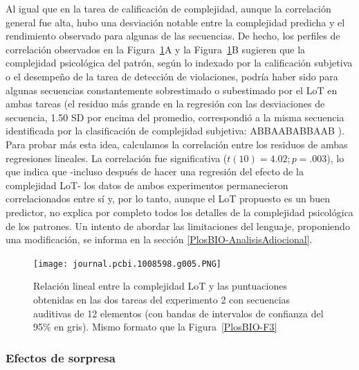 Al igual que en la tarea de calificación de complejidad, aunque la correlación general fue alta, hubo una desviación notable entre la complejidad predicha y el rendimiento observado para algunas de las secuencias. De hecho, los perfiles de correlación observados en la Figura~\ref{PlosBIO-F5}A y la Figura~\ref{PlosBIO-F5}B sugieren que la complejidad psicológica del patrón, según lo indexado por la calificación subjetiva o el desempeño de la tarea de detección de violaciones, podría haber sido para algunas secuencias constantemente sobrestimado o subestimado por el LoT en ambas tareas (el residuo más grande en la regresión con las desviaciones de secuencia, 1.50 SD por encima del promedio, correspondió a la misma secuencia identificada por la clasificación de complejidad subjetiva: ABBAABABBAAB ). Para probar más esta idea, calculamos la correlación entre los residuos de ambas regresiones lineales. La correlación fue significativa ($t (10) = 4.02; p  = .003$), lo que indica que -incluso después de hacer una regresión del efecto de la complejidad LoT- los datos de ambos experimentos permanecieron correlacionados entre sí y, por lo tanto, aunque el LoT propuesto es un buen predictor, no explica por completo todos los detalles de la complejidad psicológica de los patrones. Un intento de abordar las limitaciones del lenguaje, proponiendo una modificación, se informa en la sección \ref{PlosBIO-AnalisisAdiocional}.

\begin{figure}[t!]
      \texttt{[image: journal.pcbi.1008598.g005.PNG]}
      \centering
      \caption{Relación lineal entre la complejidad LoT y las puntuaciones obtenidas en las dos tareas del experimento 2 con secuencias auditivas de 12 elementos (con bandas de intervalos de confianza del 95\% en gris). Mismo formato que la Figura~\ref{PlosBIO-F3}}
      \label{PlosBIO-F5}
\end{figure}

\subsubsection{Efectos de sorpresa}

